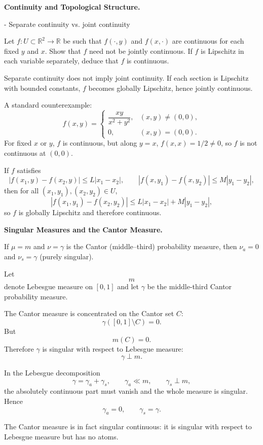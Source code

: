 \begin{problem}[CP-II-0020]
\label{prob:cp-ii-0020}
\textbf{Continuity and Topological Structure.}

\hspace*{1.5em}- Separate continuity vs. joint continuity

Let $f:U\subset\mathbb{R}^2\to\mathbb{R}$ be such that
$f(\cdot,y)$ and $f(x,\cdot)$ are continuous for each fixed $y$ and $x$.
Show that $f$ need not be jointly continuous.
If $f$ is Lipschitz in each variable separately, deduce that $f$ is continuous.

Separate continuity does not imply joint continuity.
If each section is Lipschitz with bounded constants, $f$ becomes globally Lipschitz, hence jointly continuous.
\end{problem}

\begin{solution}
A standard counterexample:
\[
f(x,y)=
\begin{cases}
	\dfrac{xy}{x^2+y^2}, & (x,y)\ne(0,0),\\[4pt]
	0,&(x,y)=(0,0).
\end{cases}
\]
For fixed $x$ or $y$, $f$ is continuous, but along $y=x$,
$f(x,x)=1/2\ne0$, so $f$ is not continuous at $(0,0)$.

If $f$ satisfies
\[
|f(x_1,y)-f(x_2,y)|\le L|x_1-x_2|,\qquad
|f(x,y_1)-f(x,y_2)|\le M|y_1-y_2|,
\]
then for all $(x_1,y_1),(x_2,y_2)\in U$,
\[
|f(x_1,y_1)-f(x_2,y_2)|\le L|x_1-x_2|+M|y_1-y_2|,
\]
so $f$ is globally Lipschitz and therefore continuous.
\end{solution}

\begin{problem}[CP-II-0024]
\label{prob:cp-ii-0024}
\textbf{Singular Measures and the Cantor Measure.}

\hspace*{1.5em}If $\mu=m$ and $\nu=\gamma$ is the Cantor (middle--third) probability measure, then
		$\nu_a=0$ and $\nu_s=\gamma$ (purely singular).
\end{problem}

\begin{solution}
Let
\[
m
\]
denote Lebesgue measure on \([0,1]\) and let \(\gamma\) be the middle-third Cantor
probability measure.

The Cantor measure is concentrated on the Cantor set \(C\):
\[
\gamma([0,1]\setminus C)=0.
\]
But
\[
m(C)=0.
\]
Therefore \(\gamma\) is singular with respect to Lebesgue measure:
\[
\gamma\perp m.
\]

In the Lebesgue decomposition
\[
\gamma=\gamma_a+\gamma_s,
\qquad
\gamma_a\ll m,
\qquad
\gamma_s\perp m,
\]
the absolutely continuous part must vanish and the whole measure is singular. Hence
\[
\boxed{
\gamma_a=0,
\qquad
\gamma_s=\gamma.
}
\]

The Cantor measure is in fact singular continuous: it is singular with respect to Lebesgue
measure but has no atoms.
\end{solution}



